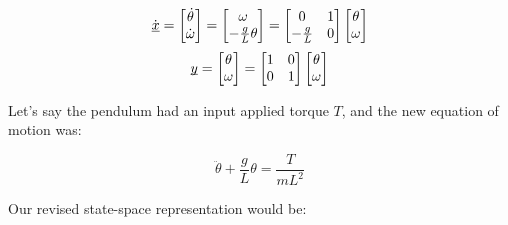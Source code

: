 \documentclass{report}
\begin{document}
\begin{onehalfspacing}
\begin{flushleft}
\vspace{-0.1in}
\[\dot{\underbar{\(x\)}} = \begin{bmatrix}
    \dot{\theta} \\
    \dot{\omega}  \end{bmatrix} = \begin{bmatrix}
    \omega \\
    -\frac{g}{L} \theta
\end{bmatrix} = \begin{bmatrix}
    0 & 1\\
    -\frac{g}{L} & 0
\end{bmatrix} \begin{bmatrix}
    \theta \\
    \omega  \end{bmatrix}\]
\[\underbar{\(y\)} = \begin{bmatrix}
    \theta \\
    \omega  \end{bmatrix} = \begin{bmatrix}
        1 & 0\\
        0 & 1
    \end{bmatrix} \begin{bmatrix}
        \theta \\
        \omega  \end{bmatrix}\]

        
Let's say the pendulum had an input applied torque \(T\), and the new equation of motion was:

\vspace{-0.1in}
\[\ddot{\theta} + \frac{g}{L} \theta = \frac{T}{mL^2}\]

Our revised state-space representation would be:


\end{flushleft}
\end{onehalfspacing}
\end{document}
